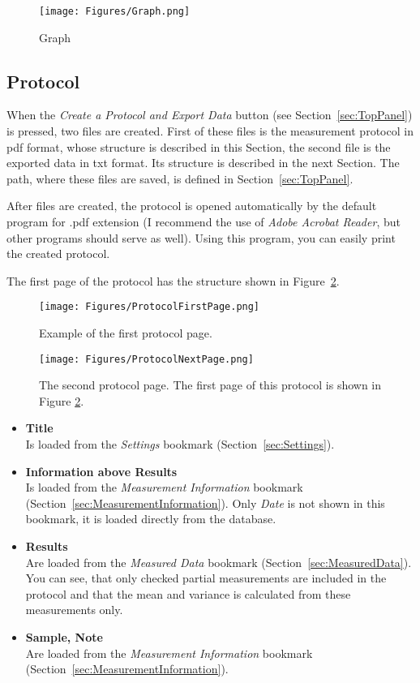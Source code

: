 \documentclass[a4paper,11pt,oneside]{report}
\theoremstyle{named}
\begin{document}
\begin{figure}[t]
  \centering
  \texttt{[image: Figures/Graph.png]}
  \caption{Graph}
  \label{fig:Graph}
\end{figure}

\subsection{Protocol}
\label{sec:Protocol}

When the \textit{Create a Protocol and Export Data} button (see
Section~\ref{sec:TopPanel}) is pressed, two files are created. First of these
files is the measurement protocol in pdf format, whose structure is described in
this Section, the second file is the exported data in txt format. Its structure
is described in the next Section. The path, where these files are saved, is
defined in Section~\ref{sec:TopPanel}. 

After files are created, the protocol is opened automatically by the default
program for .pdf extension (I recommend the use of \textit{Adobe Acrobat
Reader}, but other programs should serve as well). Using this program, you can
easily print the created protocol. 

The first page of the protocol has the structure shown in
Figure~\ref{fig:ProtocolFirstPage}. 

\begin{figure}[t]
  \centering
  \texttt{[image: Figures/ProtocolFirstPage.png]}
  \caption{Example of the first protocol page.}
  \label{fig:ProtocolFirstPage}
\end{figure}

\begin{figure}[p]
  \centering
  \texttt{[image: Figures/ProtocolNextPage.png]}
  \caption{The second protocol page. The first page of this protocol is shown
    in Figure \ref{fig:ProtocolFirstPage}.}
  \label{fig:ProtocolNextPage}
\end{figure}

\begin{itemize}
  \item \textbf{Title} \\
    Is loaded from the \textit{Settings} bookmark (Section~\ref{sec:Settings}).
  \item \textbf{Information above Results} \\
    Is loaded from the \textit{Measurement Information} bookmark
    (Section~\ref{sec:MeasurementInformation}). Only \textit{Date} is not shown
    in this bookmark, it is loaded directly from the database.
  \item \textbf{Results} \\
    Are loaded from the \textit{Measured Data} bookmark
    (Section~\ref{sec:MeasuredData}). You can see, that only checked partial
    measurements are included in the protocol and that the mean and variance is
    calculated from these measurements only. 
  \item \textbf{Sample, Note} \\
    Are loaded from the \textit{Measurement Information} bookmark
    (Section~\ref{sec:MeasurementInformation}).
\end{itemize}
\end{document}
